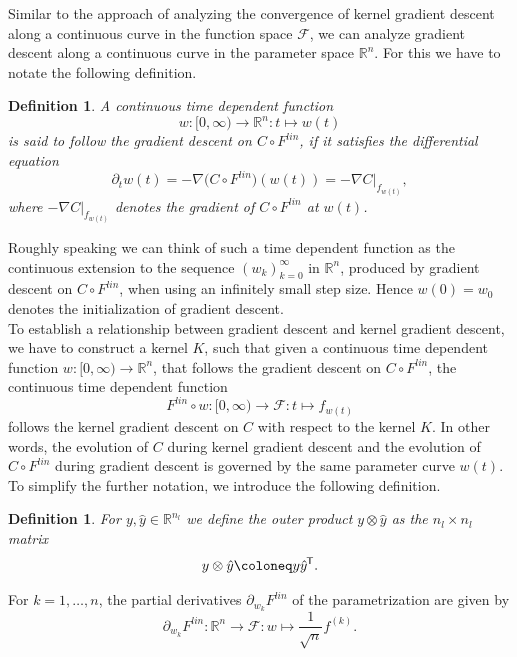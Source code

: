 \documentclass[11pt, a4paper]{article}
\newtheorem{definition}[theorem]{Definition}
\newcommand{\R}{\mathbb{R}}
\newcommand{\F}{\mathcal{F}}
\newcommand*{\tr}{^{\mkern-1.5mu\mathsf{T}}}
\begin{document}
Similar to the approach of analyzing the convergence of kernel gradient descent along a continuous curve in the function space $\F$, we can analyze gradient descent along a continuous curve in the parameter space $\R^n$. For this we have to notate the following definition.

\begin{definition} \label{def:follow}
A continuous time dependent function 
\[ w : [0,\infty) \to \R^n : t \mapsto w(t) \] 
is said to follow the gradient descent on $C \circ F^\textit{lin}$, if it satisfies the differential equation
\[ \partial_tw(t) = - \nabla \big (C \circ F^\textit{lin} \big ) (w(t)) = - \nabla C|_{f_{w(t)}}, \]
where $- \nabla C|_{f_{w(t)}}$ denotes the gradient of $C \circ F^\textit{lin}$ at $w(t)$.
\end{definition}

Roughly speaking we can think of such a time dependent function as the continuous extension to the sequence $(w_k)_{k=0}^\infty$ in $\R^n$, produced by gradient descent on $C \circ F^\textit{lin}$, when using an infinitely small step size. Hence $w(0) = w_0$ denotes the initialization of gradient descent. \\

To establish a relationship between gradient descent and kernel gradient descent, we have to construct a kernel $K$, such that given a continuous time dependent function $w: [0, \infty) \to \R^n$, that follows the gradient descent on $C \circ F^\textit{lin}$, the continuous time dependent function
\[ F^\textit{lin} \circ w : [0, \infty) \to \F : t \mapsto f_{w(t)} \]
follows the kernel gradient descent on $C$ with respect to the kernel $K$. In other words, the evolution of $C$ during kernel gradient descent and the evolution of $C \circ F^\textit{lin}$ during gradient descent is governed by the same parameter curve $w(t)$. \\

To simplify the further notation, we introduce the following definition.

\begin{definition}
For $y, \hat{y} \in \R^{n_l}$ we define the outer product $y \otimes \hat{y}$ as the $n_l \times n_l$ matrix
\[ y \otimes \hat{y} \coloneq y \hat{y} \tr. \]
\end{definition}

For $k=1,\dots,n$, the partial derivatives $\partial_{w_{k}}F^\textit{lin}$ of the parametrization are given by
\[ \partial_{w_{k}}F^\textit{lin} : \R^n \to \F: w \mapsto \frac{1}{\sqrt{n}}f^{(k)}. \]
\end{document}
